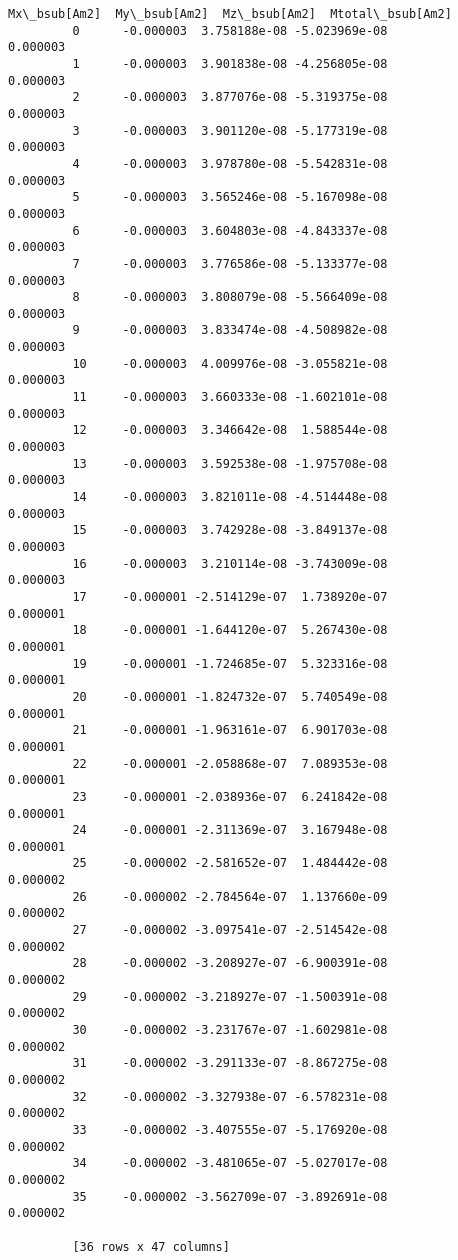 \documentclass{article}
\begin{document}
\begin{Verbatim}[commandchars=\\\{\}]
             Mx\_bsub[Am2]  My\_bsub[Am2]  Mz\_bsub[Am2]  Mtotal\_bsub[Am2]  
         0      -0.000003  3.758188e-08 -5.023969e-08          0.000003  
         1      -0.000003  3.901838e-08 -4.256805e-08          0.000003  
         2      -0.000003  3.877076e-08 -5.319375e-08          0.000003  
         3      -0.000003  3.901120e-08 -5.177319e-08          0.000003  
         4      -0.000003  3.978780e-08 -5.542831e-08          0.000003  
         5      -0.000003  3.565246e-08 -5.167098e-08          0.000003  
         6      -0.000003  3.604803e-08 -4.843337e-08          0.000003  
         7      -0.000003  3.776586e-08 -5.133377e-08          0.000003  
         8      -0.000003  3.808079e-08 -5.566409e-08          0.000003  
         9      -0.000003  3.833474e-08 -4.508982e-08          0.000003  
         10     -0.000003  4.009976e-08 -3.055821e-08          0.000003  
         11     -0.000003  3.660333e-08 -1.602101e-08          0.000003  
         12     -0.000003  3.346642e-08  1.588544e-08          0.000003  
         13     -0.000003  3.592538e-08 -1.975708e-08          0.000003  
         14     -0.000003  3.821011e-08 -4.514448e-08          0.000003  
         15     -0.000003  3.742928e-08 -3.849137e-08          0.000003  
         16     -0.000003  3.210114e-08 -3.743009e-08          0.000003  
         17     -0.000001 -2.514129e-07  1.738920e-07          0.000001  
         18     -0.000001 -1.644120e-07  5.267430e-08          0.000001  
         19     -0.000001 -1.724685e-07  5.323316e-08          0.000001  
         20     -0.000001 -1.824732e-07  5.740549e-08          0.000001  
         21     -0.000001 -1.963161e-07  6.901703e-08          0.000001  
         22     -0.000001 -2.058868e-07  7.089353e-08          0.000001  
         23     -0.000001 -2.038936e-07  6.241842e-08          0.000001  
         24     -0.000001 -2.311369e-07  3.167948e-08          0.000001  
         25     -0.000002 -2.581652e-07  1.484442e-08          0.000002  
         26     -0.000002 -2.784564e-07  1.137660e-09          0.000002  
         27     -0.000002 -3.097541e-07 -2.514542e-08          0.000002  
         28     -0.000002 -3.208927e-07 -6.900391e-08          0.000002  
         29     -0.000002 -3.218927e-07 -1.500391e-08          0.000002  
         30     -0.000002 -3.231767e-07 -1.602981e-08          0.000002  
         31     -0.000002 -3.291133e-07 -8.867275e-08          0.000002  
         32     -0.000002 -3.327938e-07 -6.578231e-08          0.000002  
         33     -0.000002 -3.407555e-07 -5.176920e-08          0.000002  
         34     -0.000002 -3.481065e-07 -5.027017e-08          0.000002  
         35     -0.000002 -3.562709e-07 -3.892691e-08          0.000002  
         
         [36 rows x 47 columns]
\end{Verbatim}
        
\end{document}
